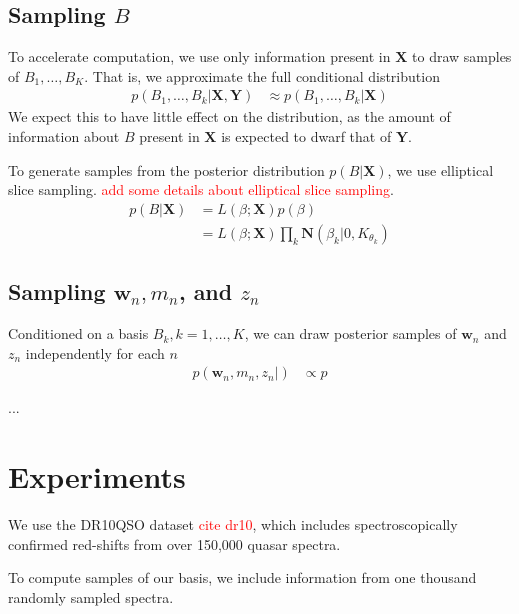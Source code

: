 \documentclass{article}
\newcommand{\red}[1]{\textcolor{red}{#1}}
\begin{document}
\subsection{Sampling $B$}
To accelerate computation, we use only information present in $\mathbf{X}$ to draw samples of $B_1, \dots, B_K$.  That is, we approximate the full conditional distribution 
\begin{align}
  p(B_1,\dots, B_k | \mathbf{X}, \mathbf{Y}) 
    &\approx p(B_1, \dots, B_k | \mathbf{X})
\end{align}
We expect this to have little effect on the distribution, as the amount of information about $B$ present in $\mathbf{X}$ is expected to dwarf that of $\mathbf{Y}$.  

To generate samples from the posterior distribution $p(B | \mathbf{X})$, we use elliptical slice sampling.  \red{add some details about elliptical slice sampling}. 
\begin{align}
  p(B | \mathbf{X}) 
    &= L(\beta; \mathbf{X}) p(\beta) \\
    &= L(\beta; \mathbf{X}) \prod_{k} \mathbf{N}(\beta_k | 0, K_{\theta_k})
\end{align}

\subsection{Sampling $\mathbf{w}_n, m_n$, and $z_n$}
Conditioned on a basis $B_k, k=1,\dots, K$, we can draw posterior samples of $\mathbf{w}_n$ and $z_n$ independently for each $n$
\begin{align}
  p(\mathbf{w}_n, m_n, z_n | ) &\propto p 
\end{align}

...
 


\section{Experiments}

We use the DR10QSO dataset \red{cite dr10}, which includes spectroscopically confirmed red-shifts from over 150,000 quasar spectra.  

To compute samples of our basis, we include information from one thousand randomly sampled spectra. 
\end{document}
